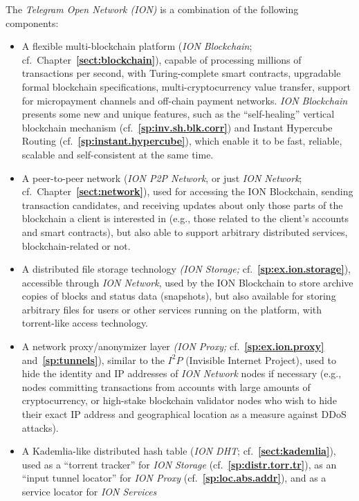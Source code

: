 \documentclass[12pt,oneside]{article}
\def\refpoint#1{{\rm\textbf{\ref{#1}}}}
\let\ptref=\refpoint
\begin{document}
The {\em Telegram Open Network (ION)} is a combination of the
following components:
\begin{itemize}
\item A flexible multi-blockchain platform ({\em ION Blockchain};
  cf.\ Chapter~\ptref{sect:blockchain}), capable of processing
  millions of transactions per second, with Turing-complete smart
  contracts, upgradable formal blockchain specifications,
  multi-cryptocurrency value transfer, support for micropayment
  channels and off-chain payment networks. {\em ION Blockchain\/}
  presents some new and unique features, such as the ``self-healing''
  vertical block\-chain mechanism (cf.~\ptref{sp:inv.sh.blk.corr}) and
  Instant Hypercube Routing (cf.~\ptref{sp:instant.hypercube}), which
  enable it to be fast, reliable, scalable and self-consistent at the
  same time.
\item A peer-to-peer network ({\em ION P2P Network}, or just {\em ION
  Network}; cf.\ Chapter~\ptref{sect:network}), used for accessing the
  ION Block\-chain, sending transaction candidates, and receiving
  updates about only those parts of the blockchain a client is
  interested in (e.g., those related to the client's accounts and
  smart contracts), but also able to support arbitrary distributed
  services, blockchain-related or not.
\item A distributed file storage technology {\em (ION Storage;}
  cf.~\ptref{sp:ex.ion.storage}), accessible through {\em ION
    Network}, used by the ION Blockchain to store archive copies of
  blocks and status data (snapshots), but also available for storing
  arbitrary files for users or other services running on the platform,
  with torrent-like access technology.
\item A network proxy/anonymizer layer {\em (ION Proxy;}
  cf.~\ptref{sp:ex.ion.proxy} and~\ptref{sp:tunnels}), similar to the
  $I^2P$ (Invisible Internet Project), used to hide the identity and
  IP addresses of {\em ION Network\/} nodes if necessary (e.g., nodes
  committing transactions from accounts with large amounts of
  cryptocurrency, or high-stake blockchain validator nodes who wish to
  hide their exact IP address and geographical location as a measure
  against DDoS attacks).
\item A Kademlia-like distributed hash table ({\em ION DHT};
  cf.~\ptref{sect:kademlia}), used as a ``torrent tracker'' for {\em
    ION Storage} (cf.~\ptref{sp:distr.torr.tr}), as an ``input tunnel
  locator'' for {\em ION Proxy\/} (cf.~\ptref{sp:loc.abs.addr}), and
  as a service locator for {\em ION Services}

\end{itemize}
\end{document}
